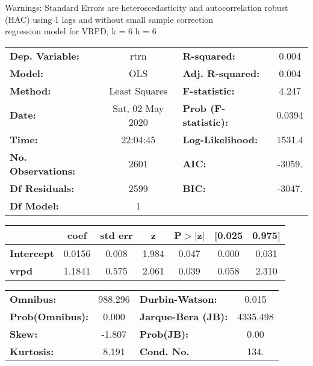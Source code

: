Warnings: \newline
 [1] Standard Errors are heteroscedasticity and autocorrelation robust (HAC) using 1 lags and without small sample correction\\ 

regression model for VRPD, k = 6 h = 6\begin{center}
\begin{tabular}{lclc}
\toprule
\textbf{Dep. Variable:}    &       rtrn       & \textbf{  R-squared:         } &     0.004   \\
\textbf{Model:}            &       OLS        & \textbf{  Adj. R-squared:    } &     0.004   \\
\textbf{Method:}           &  Least Squares   & \textbf{  F-statistic:       } &     4.247   \\
\textbf{Date:}             & Sat, 02 May 2020 & \textbf{  Prob (F-statistic):} &   0.0394    \\
\textbf{Time:}             &     22:04:45     & \textbf{  Log-Likelihood:    } &    1531.4   \\
\textbf{No. Observations:} &        2601      & \textbf{  AIC:               } &    -3059.   \\
\textbf{Df Residuals:}     &        2599      & \textbf{  BIC:               } &    -3047.   \\
\textbf{Df Model:}         &           1      & \textbf{                     } &             \\
\bottomrule
\end{tabular}
\begin{tabular}{lcccccc}
                   & \textbf{coef} & \textbf{std err} & \textbf{z} & \textbf{P$> |$z$|$} & \textbf{[0.025} & \textbf{0.975]}  \\
\midrule
\textbf{Intercept} &       0.0156  &        0.008     &     1.984  &         0.047        &        0.000    &        0.031     \\
\textbf{vrpd}      &       1.1841  &        0.575     &     2.061  &         0.039        &        0.058    &        2.310     \\
\bottomrule
\end{tabular}
\begin{tabular}{lclc}
\textbf{Omnibus:}       & 988.296 & \textbf{  Durbin-Watson:     } &    0.015  \\
\textbf{Prob(Omnibus):} &   0.000 & \textbf{  Jarque-Bera (JB):  } & 4335.498  \\
\textbf{Skew:}          &  -1.807 & \textbf{  Prob(JB):          } &     0.00  \\
\textbf{Kurtosis:}      &   8.191 & \textbf{  Cond. No.          } &     134.  \\
\bottomrule
\end{tabular}
\end{center}

